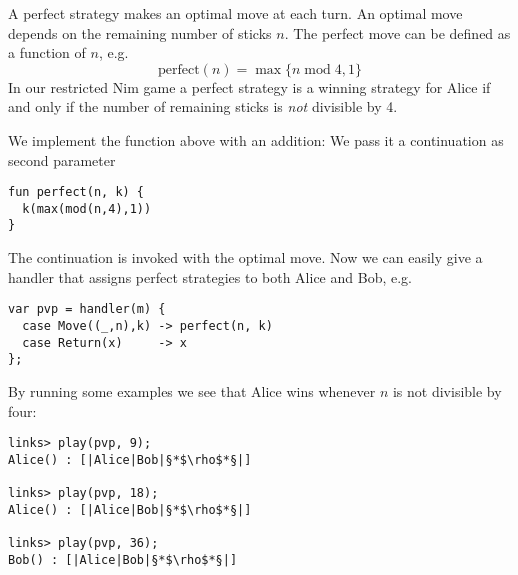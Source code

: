 \begin{example}\label{ex:nim-perfect}
A perfect strategy makes an optimal move at each turn. An optimal move depends on the remaining number of sticks $n$. The perfect move can be defined as a function of $n$, e.g.
\[ \text{perfect}(n) = \max\{n\; \text{mod}\; 4, 1\} \]
In our restricted Nim game a perfect strategy is a winning strategy for Alice if and only if the number of remaining sticks is \emph{not} divisible by 4.

We implement the function  above with an addition: We pass it a continuation as second parameter
\begin{lstlisting}[style=links]
fun perfect(n, k) {
  k(max(mod(n,4),1))
}
\end{lstlisting}
The continuation is invoked with the optimal move. Now we can easily give a handler that assigns perfect strategies to both Alice and Bob, e.g.
\begin{lstlisting}[style=links]
var pvp = handler(m) {
  case Move((_,n),k) -> perfect(n, k)
  case Return(x)     -> x
};
\end{lstlisting}
By running some examples we see that Alice wins whenever $n$ is not divisible by four:
\begin{lstlisting}[style=links]
links> play(pvp, 9);
Alice() : [|Alice|Bob|§*$\rho$*§|]

links> play(pvp, 18);
Alice() : [|Alice|Bob|§*$\rho$*§|]

links> play(pvp, 36);
Bob() : [|Alice|Bob|§*$\rho$*§|]
\end{lstlisting}
\end{example}

